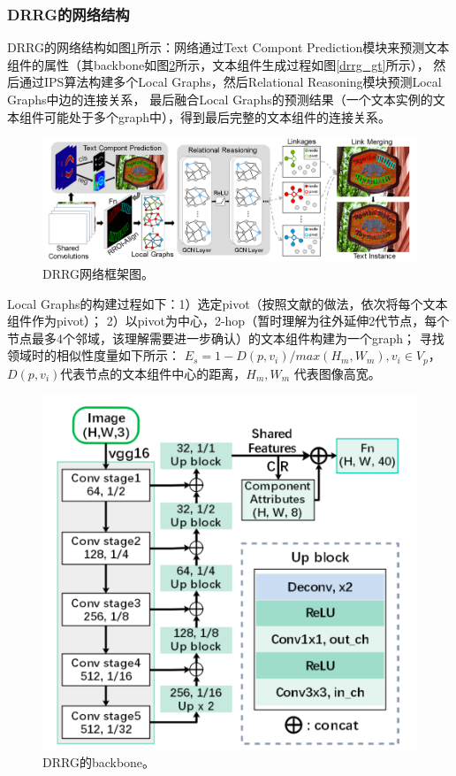 \subsubsection{DRRG的网络结构}
DRRG的网络结构如图\ref{drrg_framework}所示：网络通过Text Compont Prediction模块来预测文本组件的属性（其backbone如图\ref{drrg_backbone}所示，文本组件生成过程如图\ref{drrg_gt}所示），
然后通过IPS\cite{wang2019linkage}算法构建多个Local Graphs，然后Relational Reasoning模块预测Local Graphs中边的连接关系，
最后融合Local Graphs的预测结果（一个文本实例的文本组件可能处于多个graph中），得到最后完整的文本组件的连接关系。
\begin{figure}[H]
    \centering
    \includegraphics[width=.98\textwidth]{figure/detection/drrg_framework.png} 
    \caption{DRRG网络框架图。} 
    \label{drrg_framework} 
\end{figure}

Local Graphs的构建过程如下：1）选定pivot（按照文献\cite{wang2019linkage}的做法，依次将每个文本组件作为pivot）；
2）以pivot为中心，2-hop（暂时理解为往外延伸2代节点，每个节点最多4个邻域，该理解需要进一步确认）的文本组件构建为一个graph；
寻找领域时的相似性度量如下所示：
$E_{s} = 1 - D(p, v_{i})/max(H_{m},W_{m}), v_{i} \in V_{p}$，$D(p, v_{i})$代表节点的文本组件中心的距离，$H_{m},W_{m}$
代表图像高宽。

\begin{figure}[H]
    \centering
    \includegraphics[width=.5\textwidth]{figure/detection/drrg_backbone.png} 
    \caption{DRRG的backbone。} 
    \label{drrg_backbone} 
\end{figure}

